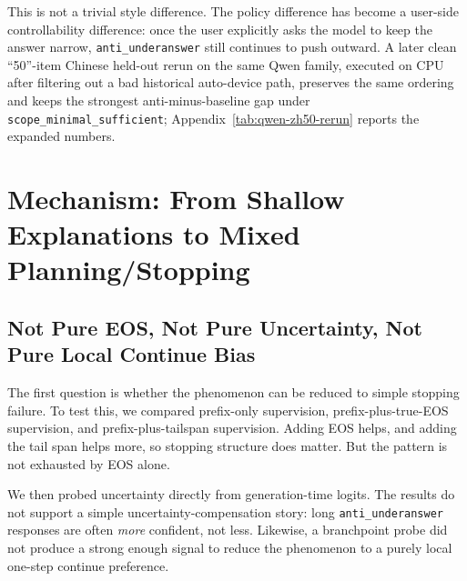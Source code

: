 \documentclass[11pt]{article}
\begin{document}
This is not a trivial style difference. The policy difference has become a user-side controllability difference: once the user explicitly asks the model to keep the answer narrow, \texttt{anti\_underanswer} still continues to push outward.
A later clean ``50''-item Chinese held-out rerun on the same Qwen family, executed on CPU after filtering out a bad historical auto-device path, preserves the same ordering and keeps the strongest anti-minus-baseline gap under \texttt{scope\_minimal\_sufficient}; Appendix~\ref{tab:qwen-zh50-rerun} reports the expanded numbers.

\section{Mechanism: From Shallow Explanations to Mixed Planning/Stopping}
\label{sec:mechanism}

\subsection{Not Pure EOS, Not Pure Uncertainty, Not Pure Local Continue Bias}

The first question is whether the phenomenon can be reduced to simple stopping failure. To test this, we compared prefix-only supervision, prefix-plus-true-EOS supervision, and prefix-plus-tailspan supervision. Adding EOS helps, and adding the tail span helps more, so stopping structure does matter. But the pattern is not exhausted by EOS alone.

We then probed uncertainty directly from generation-time logits. The results do not support a simple uncertainty-compensation story: long \texttt{anti\_underanswer} responses are often \emph{more} confident, not less. Likewise, a branchpoint probe did not produce a strong enough signal to reduce the phenomenon to a purely local one-step continue preference.
\end{document}
